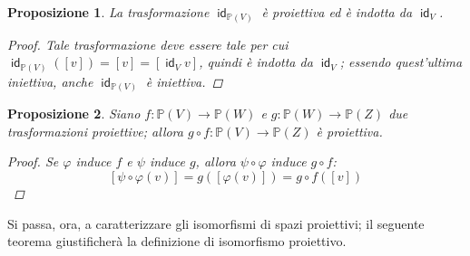 \documentclass[11pt, a4paper]{scrartcl}
\theoremstyle{style1}
\newtheorem{prop}{Proposizione}[section]
\numberwithin{equation}{subsection}
\renewcommand{\operatorname}[1]{\mathop{\mathrm{\textsf{#1}}}}
\begin{document}
\begin{prop}
	La trasformazione $\operatorname{id} _{\mathbb{P}(V)}$ \`e proiettiva ed \`e indotta da $\operatorname{id} _V$.
	\begin{proof}
		Tale trasformazione deve essere tale per cui $\operatorname{id} _{\mathbb{P}(V)} ([v]) = [v] = [\operatorname{id} _V v]$, quindi \`e indotta da $\operatorname{id} _V$; essendo quest'ultima iniettiva, anche $\operatorname{id}_{\mathbb{P}(V)}  $ \`e iniettiva.
	\end{proof}
\end{prop}
\begin{prop}
	Siano $f : \mathbb{P}(V) \to \mathbb{P}(W)$ e $g:\mathbb{P}(W) \to \mathbb{P}(Z)$ due trasformazioni proiettive; allora $g\circ f:\mathbb{P}(V)\to \mathbb{P}(Z)$ \`e proiettiva.
	\begin{proof}
		Se $\varphi $ induce $f$ e $\psi $ induce $g$, allora $\psi \circ \varphi $ induce $g \circ f$:
		\[
		\left[ \psi \circ \varphi (v) \right] = g \left(\left[ \varphi (v) \right] \right) = g \circ f \left(\left[ v \right] \right) 
		\] 
	\end{proof}
\end{prop}
\noindent Si passa, ora, a caratterizzare gli isomorfismi di spazi proiettivi; il seguente teorema giustificher\`a la definizione di isomorfismo proiettivo.
\end{document}
